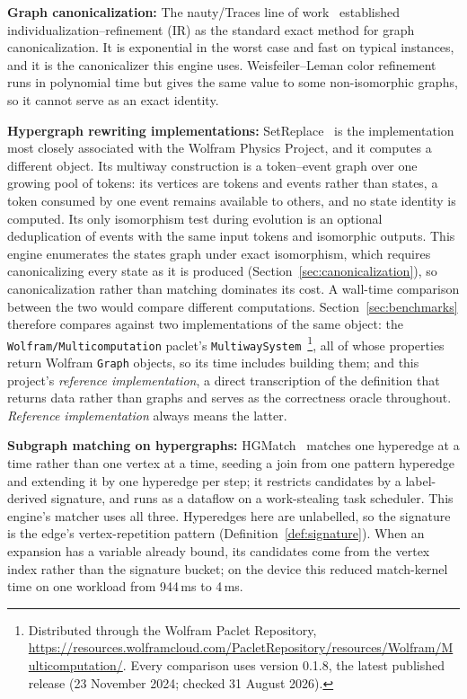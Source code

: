 \textbf{Graph canonicalization:} The nauty/Traces line of work~\cite{mckay2014practical} established individualization--refinement (IR) as the standard exact method for graph canonicalization. It is exponential in the worst case and fast on typical instances, and it is the canonicalizer this engine uses. Weisfeiler--Leman color refinement~\cite{weisfeiler1968reduction,shervashidze2011weisfeiler} runs in polynomial time but gives the same value to some non-isomorphic graphs, so it cannot serve as an exact identity.

\textbf{Hypergraph rewriting implementations:} SetReplace~\cite{setreplace} is the implementation
most closely associated with the Wolfram Physics Project, and it computes a different object. Its
multiway construction is a token--event graph over one growing pool of tokens: its vertices are
tokens and events rather than states, a token consumed by one event remains available to others,
and no state identity is computed. Its only isomorphism test during evolution is an optional
deduplication of events with the same input tokens and isomorphic outputs. This engine enumerates
the states graph under exact isomorphism, which requires canonicalizing every state as it is
produced (Section~\ref{sec:canonicalization}), so canonicalization rather than matching dominates
its cost. A wall-time comparison between the two would compare different computations.
Section~\ref{sec:benchmarks} therefore compares against two implementations of the same object: the
\texttt{Wolfram/\allowbreak Multicomputation} paclet's
\texttt{MultiwaySystem}~\citep{wolframmulticomputation}\footnote{Distributed through the Wolfram
Paclet Repository,
\url{https://resources.wolframcloud.com/PacletRepository/resources/Wolfram/Multicomputation/}.
Every comparison uses version 0.1.8, the latest published release (23 November 2024; checked 31
August 2026).}, all of whose properties return Wolfram \texttt{Graph} objects, so its time
includes building them; and this project's \emph{reference implementation}, a direct transcription
of the definition that returns data rather than graphs and serves as the correctness oracle
throughout. \emph{Reference implementation} always means the latter.

\textbf{Subgraph matching on hypergraphs:} HGMatch~\cite{yang2023hgmatch} matches one hyperedge at a time rather than one vertex at a time, seeding a join from one pattern hyperedge and extending it by one hyperedge per step; it restricts candidates by a label-derived signature, and runs as a dataflow on a work-stealing task scheduler. This engine's matcher uses all three. Hyperedges here are unlabelled, so the signature is the edge's vertex-repetition pattern (Definition~\ref{def:signature}). When an expansion has a variable already bound, its candidates come from the vertex index rather than the signature bucket; on the device this reduced match-kernel time on one workload from 944\,ms to 4\,ms.

